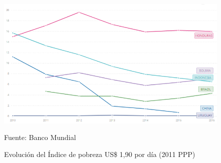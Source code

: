 \documentclass[11pt]{article}
\begin{document}
	\begin{figure}[H]
		\centering
		\begin{minipage}{.8\textwidth}
			\includegraphics[width=\textwidth]{pobreza}
			{\footnotesize Fuente: Banco Mundial\par}
		\end{minipage}
		\caption{Evolución del Índice de pobreza US\$ 1,90 por día (2011 PPP)}
	\end{figure}
\end{document}
